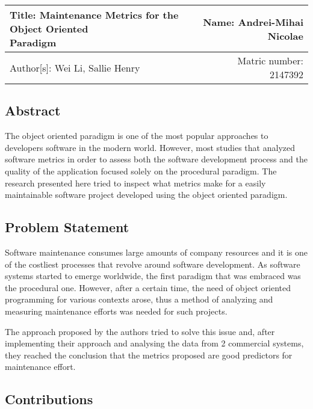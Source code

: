 \documentclass[a4paper,12pt]{article}
\begin{document}
 \begin{center}
   \begin{tabular}{ | l | r | }
    \hline
    \parbox[t]{5cm}{Title: Maintenance Metrics for the Object Oriented
                    \\ Paradigm} 
     & Name: Andrei-Mihai Nicolae \\ 
     \hline
     Author[s]: Wei Li, Sallie Henry & Matric number: 2147392 \\
    \hline
   \end{tabular}
 \end{center}

\subsection{Abstract}

The object oriented paradigm is one of the most popular approaches to developers
software in the modern world. However, most studies that analyzed software 
metrics in order to assess both the software development process and the
quality of the application focused solely on the procedural paradigm. 
The research presented here tried to inspect what metrics make for a easily
maintainable software project developed using the object oriented paradigm.

\subsection{Problem Statement}

Software maintenance consumes large amounts of company resources and it is
one of the costliest processes that revolve around software development.
As software systems started to emerge worldwide, the first paradigm that
was embraced was the procedural one. However, after a certain time, the need
of object oriented programming for various contexts arose, thus a method of
analyzing and measuring maintenance efforts was needed for such projects.

The approach proposed by the authors tried to solve this issue and, after 
implementing their approach and analysing the data from 2 commercial systems,
they reached the conclusion that the metrics proposed are good predictors
for maintenance effort.

\subsection{Contributions}
\end{document}
